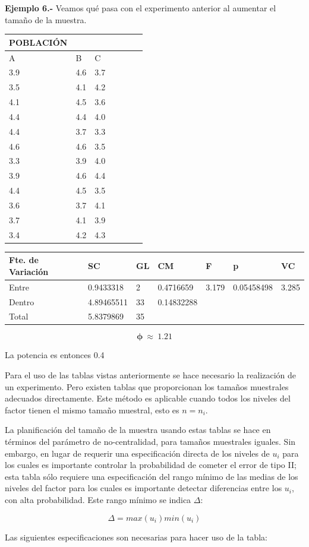 \documentclass[]{book}
\theoremstyle{definition}
\theoremstyle{definition}
\theoremstyle{definition}
\theoremstyle{remark}
\begin{document}
\textbf{Ejemplo 6.-} Veamos qué pasa con el experimento anterior al
aumentar el tamaño de la muestra.

\begin{longtable}[]{@{}lllllll@{}}
\toprule
POBLACIÓN & & & & & &\tabularnewline
\midrule
\endhead
A & B & C & & & &\tabularnewline
3.9 & 4.6 & 3.7 & & & &\tabularnewline
3.5 & 4.1 & 4.2 & & & &\tabularnewline
4.1 & 4.5 & 3.6 & & & &\tabularnewline
4.4 & 4.4 & 4.0 & & & &\tabularnewline
4.4 & 3.7 & 3.3 & & & &\tabularnewline
4.6 & 4.6 & 3.5 & & & &\tabularnewline
3.3 & 3.9 & 4.0 & & & &\tabularnewline
3.9 & 4.6 & 4.4 & & & &\tabularnewline
4.4 & 4.5 & 3.5 & & & &\tabularnewline
3.6 & 3.7 & 4.1 & & & &\tabularnewline
3.7 & 4.1 & 3.9 & & & &\tabularnewline
3.4 & 4.2 & 4.3 & & & &\tabularnewline
\bottomrule
\end{longtable}

\begin{longtable}[]{@{}lllllll@{}}
\toprule
Fte. de Variación & SC & GL & CM & F & p & VC\tabularnewline
\midrule
\endhead
Entre & 0.9433318 & 2 & 0.4716659 & 3.179 & 0.05458498 &
3.285\tabularnewline
Dentro & 4.89465511 & 33 & 0.14832288 & & &\tabularnewline
Total & 5.8379869 & 35 & & & &\tabularnewline
\bottomrule
\end{longtable}

\[
\mathbf{\phi}\  \approx \ 1.21
\]

La potencia es entonces 0.4

Para el uso de las tablas vistas anteriormente se hace necesario la
realización de un experimento. Pero existen tablas que proporcionan los
tamaños muestrales adecuados directamente. Este método es aplicable
cuando todos los niveles del factor tienen el mismo tamaño muestral,
esto es \(n = n_{i}\).

La planificación del tamaño de la muestra usando estas tablas se hace en
términos del parámetro de no-centralidad, para tamaños muestrales
iguales. Sin embargo, en lugar de requerir una especificación directa de
los niveles de \(u_{i}\) para los cuales es importante controlar la
probabilidad de cometer el error de tipo II; esta tabla sólo requiere
una especificación del rango mínimo de las medias de los niveles del
factor para los cuales es importante detectar diferencias entre los
\(u_{i}\), con alta probabilidad. Este rango mínimo se indica
\(\Delta\):

\[
\Delta = max\left( u_{i} \right)min\left( u_{i} \right)
\]

Las siguientes especificaciones son necesarias para hacer uso de la
tabla:
\end{document}
